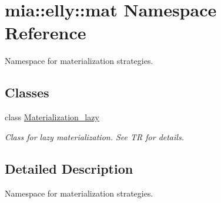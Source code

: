 \hypertarget{namespacemia_1_1elly_1_1mat}{\section{mia\-:\-:elly\-:\-:mat Namespace Reference}
\label{namespacemia_1_1elly_1_1mat}
}


Namespace for materialization strategies.  


\subsection*{Classes}
\begin{DoxyCompactItemize}
\item 
class \hyperlink{classmia_1_1elly_1_1mat_1_1_materialization__lazy}{Materialization\-\_\-lazy}
\begin{DoxyCompactList}\small\item\em Class for lazy materialization. See T\-R for details. \end{DoxyCompactList}\end{DoxyCompactItemize}


\subsection{Detailed Description}
Namespace for materialization strategies. 